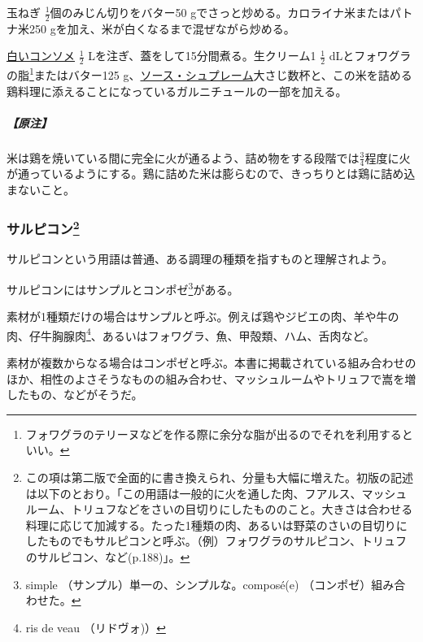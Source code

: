 \begin{recette}
玉ねぎ \(\frac{1}{2}\)個のみじん切りをバター50
gでさっと炒める。カロライナ米またはパトナ米250
gを加え、米が白くなるまで混ぜながら炒める。

\protect\hyperlink{consomme-blanc}{白いコンソメ} \(\frac{1}{2}\)
Lを注ぎ、蓋をして15分間煮る。生クリーム1 \(\frac{1}{2}\)
dLとフォワグラの脂\footnote{フォワグラのテリーヌなどを作る際に余分な脂が出るのでそれを利用するといい。}またはバター125
g、\protect\hyperlink{sauce-supreme}{ソース・シュプレーム}大さじ数杯と、この米を詰める鶏料理に添えることになっているガルニチュールの一部を加える。

\hypertarget{ux539fux6ce8-2}{%
\subparagraph{【原注】}\label{ux539fux6ce8-2}}

米は鶏を焼いている間に完全に火が通るよう、詰め物をする段階では\(\frac{3}{4}\)程度に火が通っているようにする。鶏に詰めた米は膨らむので、きっちりとは鶏に詰め込まないこと。

\hypertarget{salpicons-divers}{%
\subsubsection[サルピコン]{\texorpdfstring{サルピコン\footnote{この項は第二版で全面的に書き換えられ、分量も大幅に増えた。初版の記述は以下のとおり。「この用語は一般的に火を通した肉、フアルス、マッシュルーム、トリュフなどをさいの目切りにしたもののこと。大きさは合わせる料理に応じて加減する。たった1種類の肉、あるいは野菜のさいの目切りにしたものでもサルピコンと呼ぶ。（例）フォワグラのサルピコン、トリュフのサルピコン、など(p.188)」。}}{サルピコン}}\label{salpicons-divers}}



サルピコンという用語は普通、ある調理の種類を指すものと理解されよう。

サルピコンにはサンプルとコンポゼ\footnote{simple
  （サンプル）単一の、シンプルな。composé(e) （コンポゼ）組み合わせた。}がある。

素材が1種類だけの場合はサンプルと呼ぶ。例えば鶏やジビエの肉、羊や牛の肉、仔牛胸腺肉\footnote{ris
  de veau （リドヴォ)）}、あるいはフォワグラ、魚、甲殻類、ハム、舌肉など。

素材が複数からなる場合はコンポゼと呼ぶ。本書に掲載されている組み合わせのほか、相性のよさそうなものの組み合わせ、マッシュルームやトリュフで嵩を増したもの、などがそうだ。


\end{recette}
